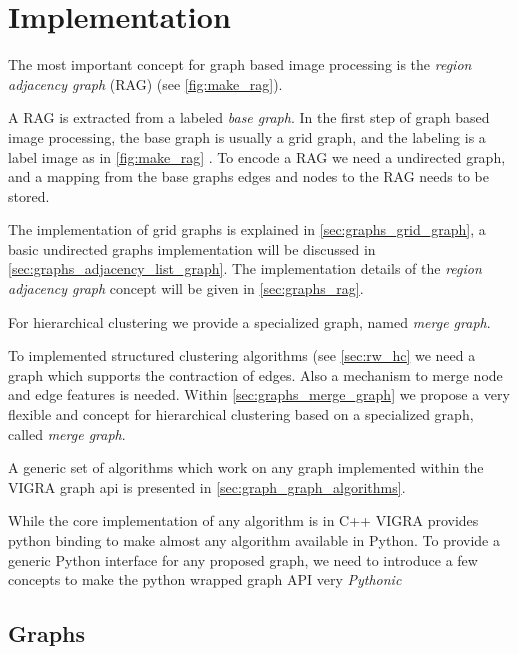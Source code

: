 

\section{Implementation}\label{sec:vigra_graph_lib_impl}


The most important concept for graph based image processing
is the \emph{region adjacency graph} (RAG) (see \cref{fig:make_rag}).

A RAG is extracted from a labeled \emph{base graph}.
In the first step of graph based image processing, the base 
graph is usually a grid graph, and the labeling is a label image
as in \cref{fig:make_rag} .
To encode a RAG we need a undirected graph, 
and a mapping from the base graphs edges and nodes to the RAG 
needs to be stored.

The implementation of grid graphs is explained in \cref{sec:graphs_grid_graph}, 
a basic undirected graphs implementation will be discussed in \cref{sec:graphs_adjacency_list_graph}.
The implementation details of the \emph{region adjacency graph} concept will 
be given in  \cref{sec:graphs_rag}.

For hierarchical clustering we provide a specialized graph, named \emph{merge graph}.


To implemented structured clustering algorithms (see \cref{sec:rw_hc} we
need a graph which supports the contraction of edges.
Also a mechanism to merge node and edge features is needed.
Within \cref{sec:graphs_merge_graph} we propose  a very flexible
and concept for hierarchical clustering based on a specialized graph,
called \emph{merge graph}.


A generic set of algorithms which work on any graph
implemented within the VIGRA graph api is presented 
in \cref{sec:graph_graph_algorithms}.

While the core implementation of any algorithm is in C++
VIGRA provides python binding to make almost
any algorithm available in Python.
To provide a generic Python interface for any proposed
graph, we need to introduce a few concepts 
to make the python wrapped graph API very \emph{Pythonic}


\subsection{Graphs}
    
    

